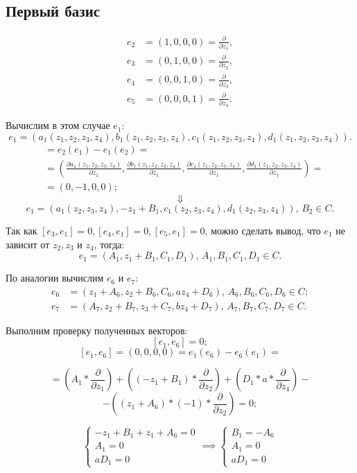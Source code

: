\documentclass[12pt]{article}
\begin{document}
\subsection{Первый базис}
\begin{align*}
e_2 &= (1,0,0,0) = \frac{\partial}{\partial z_1}, \\
e_3 &= (0,1,0,0) = \frac{\partial}{\partial z_2}, \\
e_4 &= (0,0,1,0) = \frac{\partial}{\partial z_3}, \\
e_5 &= (0,0,0,1) = \frac{\partial}{\partial z_4}. 
\end{align*}

Вычислим в этом случае $e_1$:
$$e_1 = (a_1(z_1,z_2,z_3,z_4), b_1(z_1,z_2,z_3,z_4), c_1(z_1,z_2,z_3,z_4), d_1(z_1,z_2,z_3,z_4)).$$ 
\begin{align*}
[e_2,e_1] &= e_2(e_1) - e_1(e_2) = \\
&= \left(
\frac{\partial a_1(z_1,z_2,z_3,z_4)}{\partial z_1}, 
\frac{\partial b_1(z_1,z_2,z_3,z_4)}{\partial z_1}, 
\frac{\partial c_1(z_1,z_2,z_3,z_4)}{\partial z_1},
\frac{\partial d_1(z_1,z_2,z_3,z_4)}{\partial z_1}
\right) = \\
& = (0,-1,0,0);
\end{align*}
$$\Downarrow$$
$$e_1 = (a_1(z_2,z_3,z_4), -z_1 + B_1, c_1(z_2,z_3,z_4), d_1(z_2,z_3,z_4)), \, B_2 \in C.$$

Так как $[e_3,e_1] = 0, [e_4,e_1] = 0, [e_5,e_1] = 0$, можно сделать вывод, что $e_1$ не зависит от $z_2, z_3 \text{ и } z_4$, тогда: 
$$e_1 = (A_1, z_1 + B_1, C_1, D_1), \, A_1, B_1, C_1, D_1 \in C.$$ 

По аналогии вычислим $e_6 \text{ и } e_7$:
\begin{align*}
e_6 &= (z_1 + A_6, z_2 + B_6, C_6, az_4 + D_6), \, A_6, B_6, C_6, D_6 \in C; \\
e_7 &= (A_7, z_2 + B_7, z_3 + C_7, bz_4 + D_7), \, A_7, B_7, C_7, D_7 \in C.
\end{align*}

Выполним проверку полученных векторов:
\[
[e_1, e_6] = 0;
\]
\[
[e_1, e_6] = (0, 0, 0, 0) = e_1(e_6) - e_6(e_1) = 
\]

\[
= \left(A_1 * \frac{\partial}{\partial z_1}\right)
+ \left((-z_1 + B_1) * \frac{\partial}{\partial z_2}\right)
+ \left(D_1 * a * \frac{\partial}{\partial z_4}\right) -
\]
\[
- \left((z_1 + A_6) * (-1) * \frac{\partial}{\partial z_2}\right) = 0;
\]

\[
\begin{cases}
-z_1 + B_1 + z_1 + A_6 = 0 \\
A_1 = 0 \\
aD_1 = 0
\end{cases}
\implies
\begin{cases}
B_1 = -A_6 \\
A_1 = 0 \\
aD_1 = 0
\end{cases}
\]\\
\end{document}

